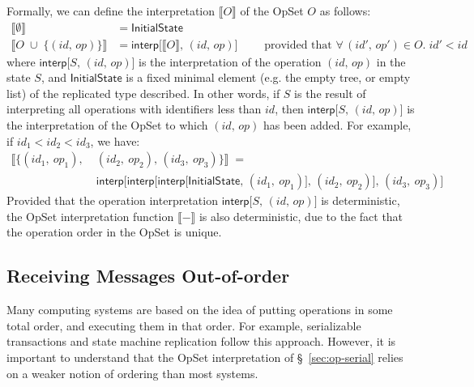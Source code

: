 Formally, we can define the interpretation $\llbracket O \rrbracket$ of the OpSet $O$ as follows:
\begin{align*}
    \big\llbracket \emptyset \big\rrbracket &= \mathsf{InitialState} \\
    \big\llbracket O \;\cup\; \{(\mathit{id},\, \mathit{op})\} \big\rrbracket &=
    \mathsf{interp}\big[\llbracket O \rrbracket,\, (\mathit{id},\, \mathit{op})\big]
    \qquad\text{ provided that } \forall\,(\mathit{id}',\, \mathit{op}') \in O.\; \mathit{id}' < \mathit{id}
\end{align*}
where $\mathsf{interp}\big[S,\, (\mathit{id},\, \mathit{op})\big]$ is the interpretation of the operation $(\mathit{id},\, \mathit{op})$ in the state $S$, and $\mathsf{InitialState}$ is a fixed minimal element (e.g. the empty tree, or empty list) of the replicated type described.
In other words, if $S$ is the result of interpreting all operations with identifiers less than $\mathit{id}$, then
$\mathsf{interp}\big[S,\, (\mathit{id},\, \mathit{op})\big]$ is the interpretation of the OpSet to which $(\mathit{id},\, \mathit{op})$ has been added.
For example, if $\mathit{id}_1 < \mathit{id}_2 < \mathit{id}_3$, we have:
\begin{align*}
    \big\llbracket \{(\mathit{id}_1,\ \mathit{op}_1),\;
    &(\mathit{id}_2,\ \mathit{op}_2),\,
    (\mathit{id}_3,\ \mathit{op}_3)\} \big\rrbracket \;=\\
    &\mathsf{interp}\big[\mathsf{interp}\big[\mathsf{interp}\big[\mathsf{InitialState},\,
    (\mathit{id}_1,\ \mathit{op}_1)\big],\,
    (\mathit{id}_2,\ \mathit{op}_2)\big],\,
    (\mathit{id}_3,\ \mathit{op}_3)\big]
\end{align*}
Provided that the operation interpretation $\mathsf{interp}\big[S,\, (\mathit{id},\, \mathit{op})\big]$ is deterministic, the OpSet interpretation function $\llbracket-\rrbracket$ is also deterministic, due to the fact that the operation order in the OpSet is unique.

\subsection{Receiving Messages Out-of-order}\label{sec:order-change}

Many computing systems are based on the idea of putting operations in some total order, and executing them in that order.
For example, serializable transactions \cite{Kleppmann:2017wj} and state machine replication \cite{Schneider:1990vy} follow this approach.
However, it is important to understand that the OpSet interpretation of \S~\ref{sec:op-serial} relies on a weaker notion of ordering than most systems.

